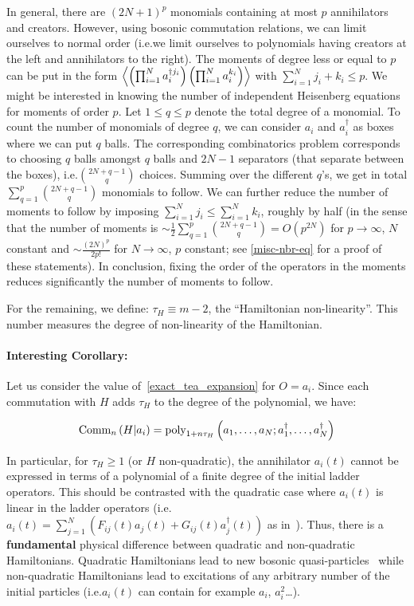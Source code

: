 In general, there are $(2N+1)^p$ monomials containing at most $p$ annihilators and creators. However, using bosonic commutation relations, we can limit ourselves to normal order (i.e.\@ we limit ourselves to polynomials having creators at the left and annihilators to the right). The moments of degree less or equal to $p$ can be put in the form $\left\langle \left(\prod_{i = 1}^N a^{\dagger j_i}_i\right) \left(\prod_{i = 1}^N a^{k_i}_i\right) \right\rangle$ with $\sum_{i=1}^N j_i+k_i \le p$. We might be interested in knowing the number of independent Heisenberg equations for moments of order $p$. Let $1 \le q \le p$ denote the total degree of a monomial. To count the number of monomials of degree $q$, we can consider $a_i$ and $a^\dagger_i$ as boxes where we can put $q$ balls. The corresponding combinatorics problem corresponds to choosing $q$ balls amongst $q$ balls and $2N-1$ separators (that separate between the boxes), i.e.\@ $\binom{2N+q-1}{q}$ choices. Summing over the different $q$'s, we get in total $\sum_{q=1}^p \binom{2N+q-1}{q}$ monomials to follow. We can further reduce the number of moments to follow by imposing $\sum_{i=1}^N j_i \le \sum_{i=1}^N k_i$, roughly by half (in the sense that the number of moments is $\sim \frac{1}{2} \sum_{q=1}^p \binom{2N+q-1}{q} = O(p^{2N})$ for $p \rightarrow \infty$, $N$ constant and $\sim \frac{(2 N)^p}{2 p!}$ for $N \rightarrow \infty$, $p$ constant; see \autoref{misc-nbr-eq} for a proof of these statements). In conclusion, fixing the order of the operators in the moments reduces significantly the number of moments to follow.

For the remaining, we define: $\tau_H \equiv m - 2$, the ``Hamiltonian non-linearity''. This number measures the degree of non-linearity of the Hamiltonian.

\paragraph{Interesting Corollary:} Let us consider the value of~\autoref{exact_tea_expansion} for $O = a_i$. Since each commutation with $H$ adds $\tau_H$ to the degree of the polynomial, we have:

\begin{equation}
    \text{Comm}_{n}\left(H | a_i\right) = \text{poly}_{1 + n \tau_H}\left(a_1, \ldots, a_N; a^\dagger_1, \ldots, a^\dagger_N\right)
\end{equation}

In particular, for $\tau_H \ge 1$ (or $H$ non-quadratic), the annihilator $a_i(t)$ cannot be expressed in terms of a polynomial of a finite degree of the initial ladder operators. This should be contrasted with the quadratic case where $a_i(t)$ is linear in the ladder operators (i.e.\@ $a_i(t) = \sum_{j=1}^N \left(F_{ij}(t) a_j(t) +G_{ij}(t) a^\dagger_j(t)\right)$ as in~\cite{elie-these}). Thus, there is a \textbf{fundamental} physical difference between quadratic and non-quadratic Hamiltonians. Quadratic Hamiltonians lead to new bosonic quasi-particles~\cite{ginzburg1958theory} while non-quadratic Hamiltonians lead to excitations of any arbitrary number of the initial particles (i.e.\@ $a_i(t)$ can contain for example $a_i$, $a^2_i$\ldots).
